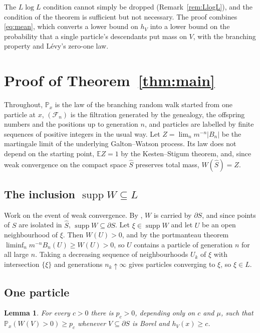 \documentclass[11pt]{amsart}
\newtheorem{lemma}[theorem]{Lemma}
\theoremstyle{definition}
\theoremstyle{remark}
\numberwithin{equation}{section}
\newcommand{\E}{\mathbb E}
\newcommand{\Pp}{\mathbb P}
\newcommand{\1}{\mathbf 1}
\newcommand{\K}{\widehat S}
\newcommand{\bd}{\partial S}
\begin{document}
The $L\log L$ condition cannot simply be dropped (Remark~\ref{rem:LlogL}), and the condition of the theorem is sufficient but not necessary. The proof combines \eqref{eq:mean}, which converts a lower bound on $h_V$ into a lower bound on the probability that a single particle's descendants put mass on $V$, with the branching property and L\'evy's zero-one law.

\section{Proof of Theorem~\ref{thm:main}}

Throughout, $\Pp_x$ is the law of the branching random walk started from one particle at $x$, $(\mathcal F_n)$ is the filtration generated by the genealogy, the offspring numbers and the positions up to generation $n$, and particles are labelled by finite sequences of positive integers in the usual way. Let $Z=\lim_nm^{-n}|B_n|$ be the martingale limit of the underlying Galton--Watson process. Its law does not depend on the starting point, $\E Z=1$ by the Kesten--Stigum theorem, and, since weak convergence on the compact space $\K$ preserves total mass, $W(\K)=Z$.

\subsection{The inclusion $\operatorname{supp}W\subseteq L$}
Work on the event of weak convergence. By \cite[Theorem~1.1]{CH}, $W$ is carried by $\bd$, and since points of $S$ are isolated in $\K$, $\operatorname{supp}W\subseteq\bd$. Let $\xi\in\operatorname{supp}W$ and let $U$ be an open neighbourhood of $\xi$. Then $W(U)>0$, and by the portmanteau theorem $\liminf_nm^{-n}B_n(U)\ge W(U)>0$, so $U$ contains a particle of generation $n$ for all large $n$. Taking a decreasing sequence of neighbourhoods $U_k$ of $\xi$ with intersection $\{\xi\}$ and generations $n_k\uparrow\infty$ gives particles converging to $\xi$, so $\xi\in L$.

\subsection{One particle}

\begin{lemma}\label{lem:one}
For every $c>0$ there is $p_c>0$, depending only on $c$ and $\mu$, such that $\Pp_x(W(V)>0)\ge p_c$ whenever $V\subseteq\bd$ is Borel and $h_V(x)\ge c$.
\end{lemma}
\end{document}
